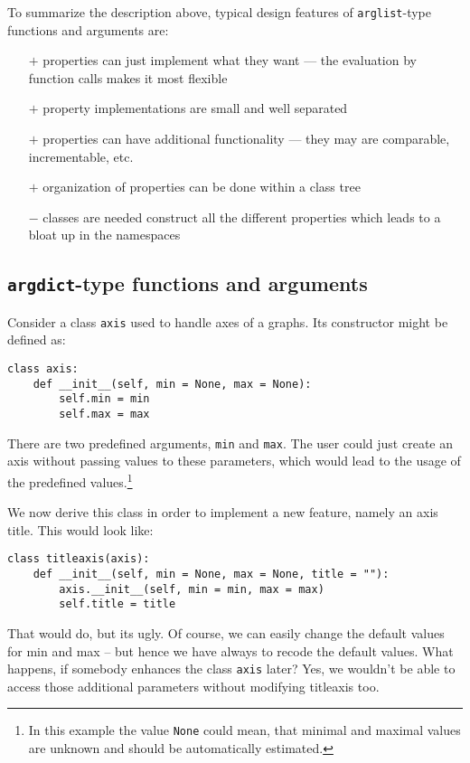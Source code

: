 \documentclass{article}
\begin{document}
To summarize the description above, typical design features of
\verb|arglist|-type functions and arguments are:
\begin{itemize}
\item[$+$]
properties can just implement what they want --- the evaluation by
function calls makes it most flexible
\item[$+$]
property implementations are small and well separated
\item[$+$]
properties can have additional functionality --- they may are
comparable, incrementable, etc.
\item[$+$]
organization of properties can be done within a class tree
\item[$-$]
classes are needed construct all the different properties which leads
to a bloat up in the namespaces
\end{itemize}

\subsection*{\texttt{argdict}-type functions and arguments}

Consider a class \verb|axis| used to handle axes of a graphs. Its
constructor might be defined as:
\begin{verbatim}
class axis:
    def __init__(self, min = None, max = None):
        self.min = min
        self.max = max
\end{verbatim}

There are two predefined arguments, \verb|min| and \verb|max|. The
user could just create an axis without passing values to these
parameters, which would lead to the usage of the predefined
values.\footnote{In this example the value \texttt{None} could mean,
that minimal and maximal values are unknown and should be
automatically estimated.}

We now derive this class in order to implement a new feature, namely
an axis title. This would look like:
\begin{verbatim}
class titleaxis(axis):
    def __init__(self, min = None, max = None, title = ""):
        axis.__init__(self, min = min, max = max)
        self.title = title
\end{verbatim}

That would do, but its ugly. Of course, we can easily change the
default values for min and max -- but hence we have always to recode
the default values. What happens, if somebody enhances the class
\verb|axis| later? Yes, we wouldn't be able to access those additional
parameters without modifying titleaxis too.
\end{document}

